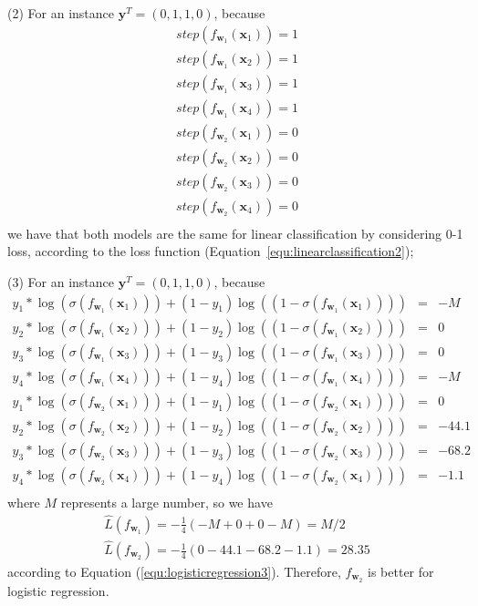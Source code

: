 \begin{example}
(2) For an instance $\textbf{y}^T=(0,1,1,0)$, because
\begin{equation}
\begin{array}{cc}
    step(f_{\textbf{w}_1}(\textbf{x}_1))=1\\
    step(f_{\textbf{w}_1}(\textbf{x}_2))=1\\
    step(f_{\textbf{w}_1}(\textbf{x}_3))=1\\
    step(f_{\textbf{w}_1}(\textbf{x}_4))=1\\
    step(f_{\textbf{w}_2}(\textbf{x}_1))=0\\
    step(f_{\textbf{w}_2}(\textbf{x}_2))=0\\
    step(f_{\textbf{w}_2}(\textbf{x}_3))=0\\
    step(f_{\textbf{w}_2}(\textbf{x}_4))=0\\
\end{array}
\end{equation}
we have that both models are the same for linear classification
 	   by considering 0-1 loss, according to the loss function (Equation~\ref{equ:linearclassification2}); 


(3) For an instance $\textbf{y}^T=(0,1,1,0)$, because 
\begin{equation}
\begin{array}{rcl}
    y_1*\log(\sigma(f_{\textbf{w}_1}(\textbf{x}_1)))+(1-y_1)\log((1-\sigma(f_{\textbf{w}_1}(\textbf{x}_1))))&=&-M\\
    y_2*\log(\sigma(f_{\textbf{w}_1}(\textbf{x}_2)))+(1-y_2)\log((1-\sigma(f_{\textbf{w}_1}(\textbf{x}_2))))&=&0\\
    y_3*\log(\sigma(f_{\textbf{w}_1}(\textbf{x}_3)))+(1-y_3)\log((1-\sigma(f_{\textbf{w}_1}(\textbf{x}_3))))&=&0\\
    y_4*\log(\sigma(f_{\textbf{w}_1}(\textbf{x}_4)))+(1-y_4)\log((1-\sigma(f_{\textbf{w}_1}(\textbf{x}_4))))&=&-M\\
    
    y_1*\log(\sigma(f_{\textbf{w}_2}(\textbf{x}_1)))+(1-y_1)\log((1-\sigma(f_{\textbf{w}_2}(\textbf{x}_1))))&=&0\\
    y_2*\log(\sigma(f_{\textbf{w}_2}(\textbf{x}_2)))+(1-y_2)\log((1-\sigma(f_{\textbf{w}_2}(\textbf{x}_2))))&=&-44.1\\
    y_3*\log(\sigma(f_{\textbf{w}_2}(\textbf{x}_3)))+(1-y_3)\log((1-\sigma(f_{\textbf{w}_2}(\textbf{x}_3))))&=&-68.2\\
    y_4*\log(\sigma(f_{\textbf{w}_2}(\textbf{x}_4)))+(1-y_4)\log((1-\sigma(f_{\textbf{w}_2}(\textbf{x}_4))))&=&-1.1\\
\end{array}
\end{equation}
where $M$ represents a large number, so we have  
\begin{equation}
\begin{array}{c}
\hat{L}(f_{\textbf{w}_1}) = -\frac{1}{4}(-M+0+0-M)=M/2\\
\hat{L}(f_{\textbf{w}_2}) = -\frac{1}{4}(0-44.1-68.2-1.1)=28.35
\end{array}
\end{equation}
according to Equation (\ref{equ:logisticregression3}). 
Therefore, $f_{\textbf{w}_2}$ is better for logistic regression. 


\end{example}
